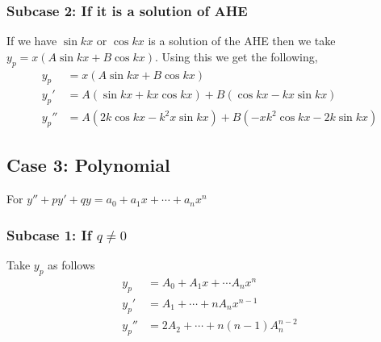 \documentclass[oneside,11pt,pdftex,final]{book}%
\numberwithin{equation}{section}
\newtheorem{example}[theorem]{Example}
\numberwithin{section}{chapter}
\numberwithin{equation}{chapter}
\begin{document}
\subsubsection{Subcase 2: If it is a solution of AHE}
If we have $ \sin kx  $ or $ \cos kx  $ is a solution of the AHE then we take $ y_p=x(A \sin kx + B \cos kx) $. Using this we get the following,
\begin{align*}
	y_p&=x(A \sin kx + B \cos kx)\\
	y_p'&=A(\sin kx + kx \cos kx)+B(\cos kx - kx \sin kx)\\
	y_p''&=A(2k \cos kx - k^2 x \sin kx)+B(-x k^2 \cos kx - 2k \sin kx)
\end{align*}



\subsection{Case 3: Polynomial}
For $ y''+py'+qy=a_0+a_1x+\cdots+a_nx^n $
\subsubsection{Subcase 1: If $ q\neq0 $}
Take $ y_p $ as follows
\begin{align*}
	y_p&=A_0+A_1x+\cdots A_nx^n\\
	y_p'&=A_1+\cdots+n A_nx^{n-1}\\
	y_p''&=2A_2+\cdots+n(n-1)A_n^{n-2}
\end{align*}
\end{document}
